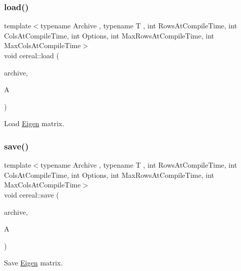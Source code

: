 \subsubsection{\texorpdfstring{load()}{load()}}
{\footnotesize\ttfamily template$<$typename Archive , typename T , int Rows\+At\+Compile\+Time, int Cols\+At\+Compile\+Time, int Options, int Max\+Rows\+At\+Compile\+Time, int Max\+Cols\+At\+Compile\+Time$>$ \\
void cereal\+::load (\begin{DoxyParamCaption}\item[{Archive \&}]{archive,  }\item[{Eigen\+::\+Matrix$<$ T, Rows\+At\+Compile\+Time, Cols\+At\+Compile\+Time, Options, Max\+Rows\+At\+Compile\+Time, Max\+Cols\+At\+Compile\+Time $>$ \&}]{A }\end{DoxyParamCaption})}



Load \hyperlink{namespaceEigen}{Eigen} matrix. 

\mbox{\label{namespacecereal_afd0f4831f36c8d183e4ff80c96b6b9ed}} 
\subsubsection{\texorpdfstring{save()}{save()}}
{\footnotesize\ttfamily template$<$typename Archive , typename T , int Rows\+At\+Compile\+Time, int Cols\+At\+Compile\+Time, int Options, int Max\+Rows\+At\+Compile\+Time, int Max\+Cols\+At\+Compile\+Time$>$ \\
void cereal\+::save (\begin{DoxyParamCaption}\item[{Archive \&}]{archive,  }\item[{const Eigen\+::\+Matrix$<$ T, Rows\+At\+Compile\+Time, Cols\+At\+Compile\+Time, Options, Max\+Rows\+At\+Compile\+Time, Max\+Cols\+At\+Compile\+Time $>$ \&}]{A }\end{DoxyParamCaption})}



Save \hyperlink{namespaceEigen}{Eigen} matrix. 

